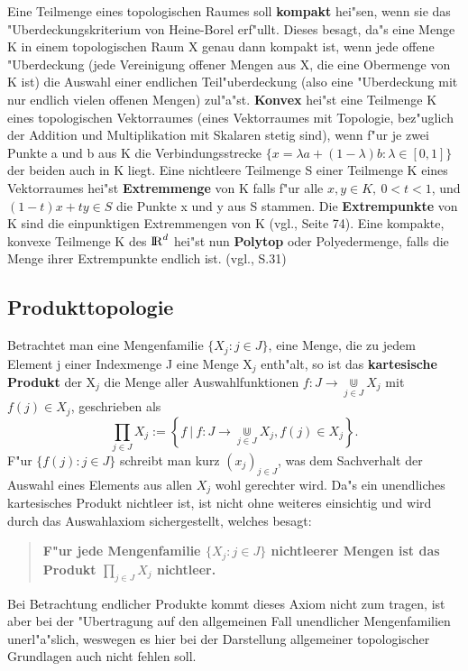 Eine Teilmenge eines topologischen Raumes soll {\bf kompakt} hei"sen, wenn sie
das "Uberdeckungskriterium von Heine-Borel erf"ullt. Dieses besagt, da"s
eine Menge K in einem topologischen Raum X genau dann kompakt
ist, wenn jede offene "Uberdeckung (jede Vereinigung offener Mengen aus X, die
eine Obermenge von K ist) die Auswahl einer endlichen Teil"uberdeckung
(also eine "Uberdeckung mit nur endlich vielen offenen Mengen) zul"a"st.
{\bf Konvex} hei"st eine Teilmenge K eines topologischen Vektorraumes (eines
Vektorraumes mit Topologie, bez"uglich der Addition und Multiplikation mit
Skalaren stetig sind), wenn f"ur je zwei Punkte a und b aus K
die Verbindungsstrecke $\{x=\lambda a +(1-\lambda) b:\lambda\in [0,1]\}$
der beiden auch in K liegt. Eine nichtleere Teilmenge S einer Teilmenge K
eines Vektorraumes hei"st {\bf Extremmenge} von K
falls f"ur alle $x,y\in K,~0<t<1$, und $(1-t)x+ty\in S$ die Punkte x und y aus
S stammen. Die {\bf Extrempunkte} von K sind die einpunktigen
Extremmengen von K (vgl.\cite{Ru:91}, Seite 74).
Eine kompakte, konvexe Teilmenge K des $\mbox{$\rm I\!R$}^d$ hei"st nun {\bf Polytop} oder
Polyedermenge, falls die Menge ihrer Extrempunkte endlich ist.
(vgl.\cite{Gr:67}, S.31)

\subsection{Produkttopologie}

Betrachtet man eine Mengenfamilie $\{X_j:j\in J\}$, eine Menge, die zu jedem
Element j einer Indexmenge J eine Menge X$_j$ enth"alt, so ist das {\bf
kartesische Produkt} der X$_j$ die Menge aller
Auswahlfunktionen $f:J\to\Cup\limits_{j\in J} X_j$ mit $f(j)\in X_j$,
geschrieben als
$$
\prod\limits_{j\in J}X_j:=
\left\{f~|~f:J\to\Cup\limits_{j\in J} X_j,f(j)\in X_j\right\}.
$$
F"ur $\{f(j):j\in J\}$ schreibt man kurz $(x_j)_{j\in J}$, was dem Sachverhalt
der Auswahl eines Elements aus allen $X_j$ wohl gerechter wird.
Da"s ein unendliches kartesisches Produkt nichtleer ist, ist nicht ohne weiteres
einsichtig und wird durch das Auswahlaxiom sichergestellt, welches besagt:
\begin{quote}
{\bf
F"ur jede Mengenfamilie $\{X_j:j\in J\}$ nichtleerer Mengen ist das Produkt
$\prod\limits_{j\in J}X_j$ nichtleer.
}
\end{quote}
Bei Betrachtung endlicher Produkte kommt dieses Axiom nicht zum tragen, ist
aber bei der "Ubertragung auf den allgemeinen Fall unendlicher Mengenfamilien
unerl"a"slich, weswegen es hier bei der Darstellung allgemeiner topologischer
Grundlagen auch nicht fehlen soll.

